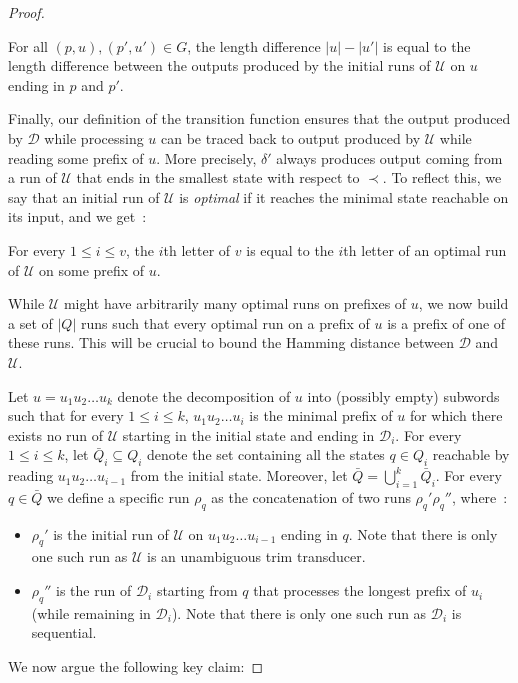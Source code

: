\documentclass[a4paper,UKenglish,cleveref, autoref, thm-restate,authorcolumns, colorlinks]{lipics-v2021}
\newcommand\calD{\mathcal{D}}
\newcommand\calU{\mathcal{U}}
\begin{document}
{\begin{proof}
    \begin{claim}\label{claim:words2}
        For all $(p,u), (p',u') \in G$,
        the length difference $|u| - |u'|$
        is equal to the length difference
        between the outputs produced by the initial runs of $\calU$ on $u$ ending in $p$ and $p'$.
    \end{claim}
    Finally, our definition of the transition function ensures that the output 
    produced by $\calD$ while processing $u$ can be traced back to output
    produced by $\calU$ while reading some prefix of $u$.
    More precisely, $\delta'$ always produces output
    coming from a run of $\calU$ that ends in the smallest state with respect to $\prec$.
    To reflect this, we say that an initial run of $\calU$ is \emph{optimal}
    if it reaches the minimal state reachable on its input, and we get~:
    \begin{claim}\label{claim:output2}
        For every $1 \leq i \leq v$,
        the $i$th letter of $v$ is equal to the $i$th letter of 
        an optimal run of $\calU$ on some prefix of $u$.
    \end{claim}
    While $\calU$ might have arbitrarily many optimal runs on prefixes of $u$,
    we now build a set of $|Q|$ runs such that every optimal run on a prefix of $u$
    is a prefix of one of these runs.
    This will be crucial to bound the Hamming distance between $\calD$
    and $\calU$.
    
    Let $u = u_1u_2 \ldots u_k$ denote the decomposition of $u$ into 
    (possibly empty) subwords such that for every $1 \leq i \leq k$,
    $u_1u_2 \ldots u_i$ is the minimal prefix of $u$
    for which there exists no run of $\calU$ starting in the initial state
    and ending in $\calD_i$.
    For every $1 \leq i \leq k$, 
    let $\bar{Q}_i \subseteq Q_i$
    denote the set containing all the states $q \in Q_i$
    reachable by reading $u_1 u_2 \dots u_{i-1}$
    from the initial state.
    Moreover, let $\bar{Q} = \bigcup_{i=1}^k \bar{Q}_i$.
    For every $q \in \bar{Q}$ we define a specific run $\rho_q$ as the
    concatenation of two runs $\rho_q'\rho_q''$, where~:
    \begin{itemize}
    \item $\rho_q'$ is the initial run of $\calU$
    on $u_1 u_2 \dots u_{i-1}$ ending in $q$.
    Note that there is only one such run as $\calU$
    is an unambiguous trim transducer.
    \item $\rho_q''$ is the run of $\calD_i$ starting from $q$
    that processes the longest prefix of $u_i$ (while remaining in $\calD_i$).
    Note that there is only one such run as $\calD_i$ is sequential.
    \end{itemize}
    We now argue the following key claim:
    

\end{proof}}
\end{document}
